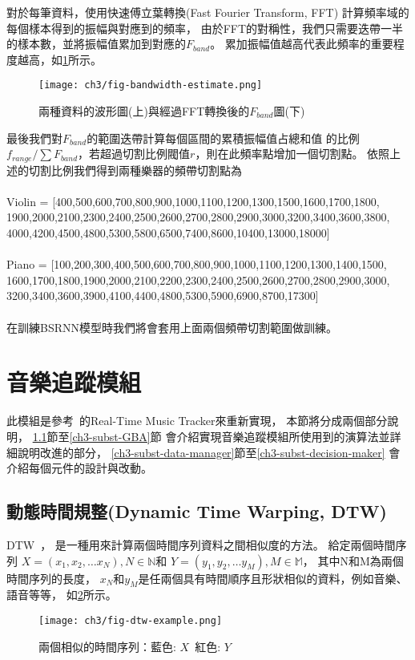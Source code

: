 \documentclass[class=NCU_thesis, crop=false]{standalone}
\begin{document}
對於每筆資料，使用快速傅立葉轉換(Fast Fourier Transform, FFT)
計算頻率域的每個樣本得到的振幅與對應到的頻率，
由於FFT的對稱性，我們只需要迭帶一半的樣本數，並將振幅值累加到對應的$F_{band}$。
累加振幅值越高代表此頻率的重要程度越高，如\cref{fig:fig-ch3-bandwidth-estimate}所示。
\begin{figure}[H]
    \centering
    \texttt{[image: ch3/fig-bandwidth-estimate.png]}
    \caption{兩種資料的波形圖(上)與經過FFT轉換後的$F_{band}$圖(下)}
    \label{fig:fig-ch3-bandwidth-estimate}
\end{figure}

最後我們對$F_{band}$的範圍迭帶計算每個區間的累積振幅值占總和值
的比例$f_{range}/\sum F_{band}$，若超過切割比例閥值$r$，則在此頻率點增加一個切割點。
依照上述的切割比例我們得到兩種樂器的頻帶切割點為 \\
\\
Violin = [400,500,600,700,800,900,1000,1100,1200,1300,1500,1600,1700,1800,\\
1900,2000,2100,2300,2400,2500,2600,2700,2800,2900,3000,3200,3400,3600,3800,\\
4000,4200,4500,4800,5300,5800,6500,7400,8600,10400,13000,18000]\\
\\
Piano = [100,200,300,400,500,600,700,800,900,1000,1100,1200,1300,1400,1500,\\
1600,1700,1800,1900,2000,2100,2200,2300,2400,2500,2600,2700,2800,2900,3000,\\
3200,3400,3600,3900,4100,4400,4800,5300,5900,6900,8700,17300]\\
\\
在訓練BSRNN模型時我們將會套用上面兩個頻帶切割範圍做訓練。

\pagebreak

\section{音樂追蹤模組} \label{ch3-st-music-tracking-module}
此模組是參考~\cite{Lin2020AHumanComputerDuetSystem}的Real-Time Music Tracker來重新實現，
本節將分成兩個部分說明，
\ref{ch3-subst-DTW}節至\ref{ch3-subst-GBA}節
會介紹實現音樂追蹤模組所使用到的演算法並詳細說明改進的部分，
\ref{ch3-subst-data-manager}節至\ref{ch3-subst-decision-maker}
會介紹每個元件的設計與改動。

\subsection{動態時間規整(Dynamic Time Warping, DTW)} \label{ch3-subst-DTW}
DTW~\cite{Sakoe1978Dynamic}，
是一種用來計算兩個時間序列資料之間相似度的方法。
給定兩個時間序列
$X = (x_1, x_2, \dots x_N), N \in \mathbb{N}$和
$Y = (y_1, y_2, \dots y_M), M \in \mathbb{M}$，
其中N和M為兩個時間序列的長度，
$x_N$和$y_M$是任兩個具有時間順序且形狀相似的資料，例如音樂、語音等等，
如\cref{fig:fig-ch3-dtw-example}所示。
\begin{figure}[!hbt]
    \centering
    \texttt{[image: ch3/fig-dtw-example.png]}
    \caption{兩個相似的時間序列：藍色: $X$\ 紅色: $Y$}
    \label{fig:fig-ch3-dtw-example}
\end{figure}
\end{document}
